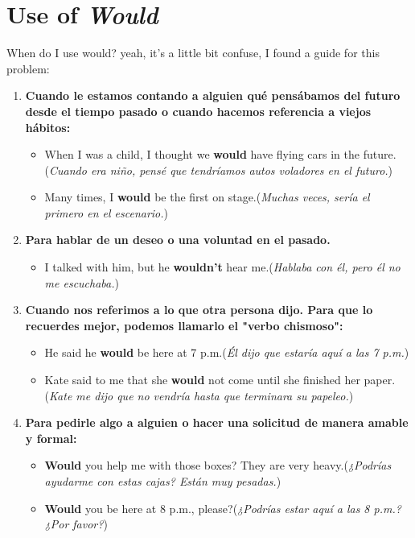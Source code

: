 \documentclass[
	12pt, %
	fleqn, %
	a4paper, %
	oneside, %
]{LegrandOrangeBook}
\begin{document}
\section{Use of \textit{Would}}
When do I use would? yeah, it's a little bit confuse, I found a guide for this problem:
\begin{enumerate}
\item \textbf{Cuando le estamos contando a alguien qué pensábamos del futuro desde el tiempo pasado o cuando hacemos referencia a viejos hábitos:}
\begin{itemize}
\item When I was a child, I thought we \textbf{would} have flying cars in the future.(\textit{Cuando era niño, pensé que tendríamos autos voladores en el futuro.})
\item Many times, I \textbf{would} be the first on stage.(\textit{Muchas veces, sería el primero en el escenario.})
\end{itemize}
\item \textbf{Para hablar de un deseo o una voluntad en el pasado.}
\begin{itemize}
\item I talked with him, but he \textbf{wouldn't} hear me.(\textit{Hablaba con él, pero él no me escuchaba.})
\end{itemize}
\item \textbf{Cuando nos referimos a lo que otra persona dijo. Para que lo recuerdes mejor, podemos llamarlo el "verbo chismoso":}
\begin{itemize}
\item He said he \textbf{would} be here at 7 p.m.(\textit{Él dijo que estaría aquí a las 7 p.m.})
\item Kate said to me that she \textbf{would} not come until she finished her paper.(\textit{Kate me dijo que no vendría hasta que terminara su papeleo.})
\end{itemize}
\item \textbf{Para pedirle algo a alguien o hacer una solicitud de manera amable y formal:}
\begin{itemize}
\item \textbf{Would} you help me with those boxes? They are very heavy.(\textit{¿Podrías ayudarme con estas cajas? Están muy pesadas.})
\item \textbf{Would} you be here at 8 p.m., please?(\textit{¿Podrías estar aquí a las 8 p.m.? ¿Por favor?})
\end{itemize}
\end{enumerate}
\end{document}
